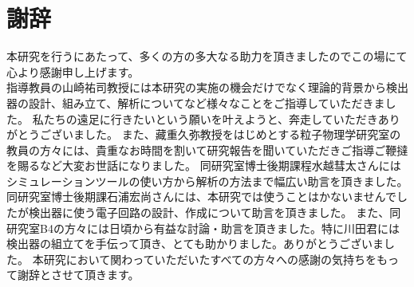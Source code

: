 \chapter{謝辞}\label{acknowledgements}
本研究を行うにあたって、多くの方の多大なる助力を頂きましたのでこの場にて心より感謝申し上げます。
\\
指導教員の山崎祐司教授には本研究の実施の機会だけでなく理論的背景から検出器の設計、組み立て、解析についてなど様々なことをご指導していただきました。
私たちの遠足に行きたいという願いを叶えようと、奔走していただきありがとうございました。
また、藏重久弥教授をはじめとする粒子物理学研究室の教員の方々には、貴重なお時間を割いて研究報告を聞いていただきご指導ご鞭撻を賜るなど大変お世話になりました。
同研究室博士後期課程水越彗太さんにはシミュレーションツールの使い方から解析の方法まで幅広い助言を頂きました。
同研究室博士後期課石浦宏尚さんには、本研究では使うことはかないませんでしたが検出器に使う電子回路の設計、作成について助言を頂きました。
また、同研究室B4の方々には日頃から有益な討論・助言を頂きました。特に川田君には検出器の組立てを手伝って頂き、とても助かりました。ありがとうございました。
本研究において関わっていただいたすべての方々への感謝の気持ちをもって謝辞とさせて頂きます。